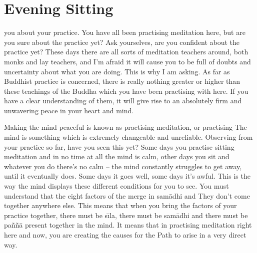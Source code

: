 
\chapter{Evening Sitting}

\vspace*{0.5\baselineskip}
 you about your practice. You have all been practising meditation here, but are you sure about the practice yet? Ask yourselves, are you confident about the practice yet? These days there are all sorts of meditation teachers around, both monks and lay teachers, and I'm afraid it will cause you to be full of doubts and uncertainty about what you are doing. This is why I am asking. As far as Buddhist practice is concerned, there is really nothing greater or higher than these teachings of the Buddha which you have been practising with here. If you have a clear understanding of them, it will give rise to an absolutely firm and unwavering peace in your heart and mind.

Making the mind peaceful is known as practising meditation, or practising  The mind is something which is extremely changeable and unreliable. Observing from your practice so far, have you seen this yet? Some days you practise sitting meditation and in no time at all the mind is calm, other days you sit and whatever you do there's no calm -- the mind constantly struggles to get away, until it eventually does. Some days it goes well, some days it's awful. This is the way the mind displays these different conditions for you to see. You must understand that the eight factors of the  merge in  sam\=adhi and  They don't come together anywhere else. This means that when you bring the factors of your practice together, there must be s\={\i}la, there must be sam\=adhi and there must be pa\~n\~n\=a present together in the mind. It means that in practising meditation right here and now, you are creating the causes for the Path to arise in a very direct way.

